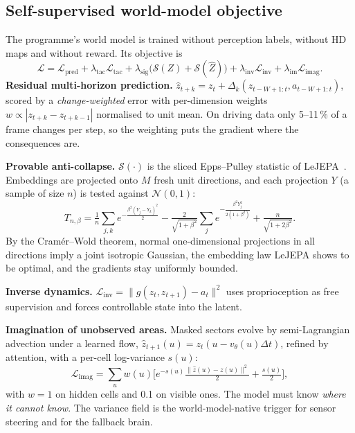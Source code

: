 \documentclass[10pt,twocolumn]{article}
\theoremstyle{remark}
\begin{document}
\subsection{Self-supervised world-model objective}
The programme's world model is trained without perception labels, without HD maps and without reward. Its objective is
\begin{equation}
\mathcal L=\mathcal L_{\mathrm{pred}}+\lambda_{\mathrm{tac}}\mathcal L_{\mathrm{tac}}+\lambda_{\mathrm{sig}}\big(\mathcal S(Z)+\mathcal S(\hat Z)\big)+\lambda_{\mathrm{inv}}\mathcal L_{\mathrm{inv}}+\lambda_{\mathrm{im}}\mathcal L_{\mathrm{imag}} .
\end{equation}
\textbf{Residual multi-horizon prediction.} $\hat z_{t+k}=z_t+\Delta_k(z_{t-W+1:t},a_{t-W+1:t})$, scored by a \emph{change-weighted}
error with per-dimension weights $w\propto|z_{t+k}-z_{t+k-1}|$ normalised to unit mean. On driving data only 5--11\,\% of a frame
changes per step, so the weighting puts the gradient where the consequences are.

\textbf{Provable anti-collapse.} $\mathcal S(\cdot)$ is the sliced Epps--Pulley statistic of LeJEPA~\cite{lejepa}. Embeddings are
projected onto $M$ fresh unit directions, and each projection $Y$ (a sample of size $n$) is tested against $\mathcal N(0,1)$:
\begin{equation}
T_{n,\beta}=\tfrac1n\!\sum_{j,k}e^{-\frac{\beta^2(Y_j-Y_k)^2}{2}}-\tfrac{2}{\sqrt{1+\beta^2}}\sum_j e^{-\frac{\beta^2Y_j^2}{2(1+\beta^2)}}+\tfrac{n}{\sqrt{1+2\beta^2}} .
\end{equation}
By the Cram\'er--Wold theorem, normal one-dimensional projections in all directions imply a joint isotropic Gaussian, the embedding
law LeJEPA shows to be optimal, and the gradients stay uniformly bounded.

\textbf{Inverse dynamics.} $\mathcal L_{\mathrm{inv}}=\|g(z_t,z_{t+1})-a_t\|^2$ uses proprioception as free supervision and forces
controllable state into the latent.

\textbf{Imagination of unobserved areas.} Masked sectors evolve by semi-Lagrangian advection under a learned flow,
$\hat z_{t+1}(u)=z_t(u-v_\theta(u)\Delta t)$, refined by attention, with a per-cell log-variance $s(u)$:
\begin{equation}
\mathcal L_{\mathrm{imag}}=\sum_u w(u)\Big[e^{-s(u)}\tfrac{\|\hat z(u)-z(u)\|^2}{2}+\tfrac{s(u)}{2}\Big],
\end{equation}
with $w=1$ on hidden cells and 0.1 on visible ones. The model must know \emph{where it cannot know}. The variance field is the
world-model-native trigger for sensor steering and for the fallback brain.
\end{document}
